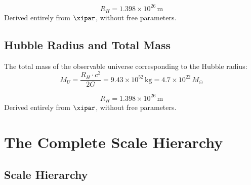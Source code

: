 \begin{keyresult}
\begin{equation}
	\boxed{R_H = 1{.}398 \times 10^{26}\,\text{m}}
\end{equation}
Derived entirely from $\xipar$, without free parameters.
\end{keyresult}

\subsection{Hubble Radius and Total Mass}

The total mass of the observable universe corresponding to the Hubble radius:
\begin{equation}
	M_U = \frac{R_H \cdot c^2}{2G} = 9{.}43 \times 10^{52}\,\text{kg} = 4{.}7 \times 10^{22}\,M_\odot
\end{equation}

\begin{keyresult}
\begin{equation}
	\boxed{R_H = 1{.}398 \times 10^{26}\,\text{m}}
\end{equation}
Derived entirely from $\xipar$, without free parameters.
\end{keyresult}

\section{The Complete Scale Hierarchy}

\subsection{Scale Hierarchy}

\begin{table}[h]
\centering
{}
\caption{Complete scale hierarchy from $\xipar = 4/30000$}
\end{table}

